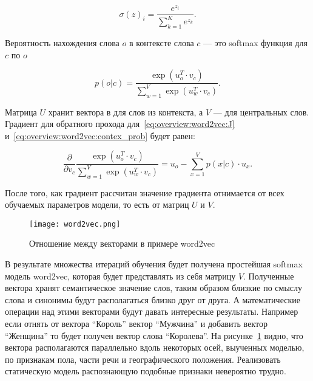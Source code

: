 \begin{equation}
  \label{eq:overview:softmax}
  {\sigma(z)}_i = \frac{e^{z_i}}{\sum_{k=1}^{K}e^{z_k}}.
\end{equation}

Вероятность нахождения слова $o$ в контексте слова $c$ --- это softmax функция для $c$ по $o$

\begin{equation}
  \label{eq:overview:word2vec:contex_prob}
  p(o|c) = \frac{\exp({u_{o}^T}\cdot{v_{c}})}{\sum_{w=1}^{V}\exp({u_w^T}\cdot{v_{c}})}.
\end{equation}

Матрица $U$ хранит вектора в для слов из контекста, а $V$ --- для центральных слов.
Градиент для обратного прохода для~\ref{eq:overview:word2vec:J} и~\ref{eq:overview:word2vec:contex_prob} будет равен:

\begin{equation}
  \frac{\partial }{\partial v_c}\frac{\exp({u_{o}^T}\cdot{v_{c}})}{\sum_{w=1}^{V}\exp({u_w^T}\cdot{v_{c}})} = u_o - \sum_{x=1}^{V}p(x|c)\cdot{u_x}.
\end{equation}

После того, как градиент рассчитан значение градиента отнимается от всех обучаемых параметров модели, то есть от матриц $U$ и $V$.

\begin{figure}[h]
  \begin{center}
    \texttt{[image: word2vec.png]}
    \caption{Отношение между векторами в примере word2vec}\label{fig:overview:word2vec}
  \end{center}
\end{figure}

В результате множества итераций обучения будет получена простейшая softmax модель word2vec, которая будет представлять из себя матрицу $V$. Полученные вектора хранят семантическое значение слов, таким образом близкие по смыслу слова и синонимы будут располагаться близко друг от друга. А математические операции над этими векторами будут давать интересные результаты. Например если отнять от вектора ``Король'' вектор ``Мужчина'' и добавить вектор ``Женщина'' то будет получен вектор слова ``Королева''. На рисунке~\ref{fig:overview:word2vec} видно, что вектора располагаются параллельно вдоль некоторых осей, выученных моделью, по признакам пола, части речи и географического положения. Реализовать статическую модель распознающую подобные признаки невероятно трудно\cite{word2vec}.

